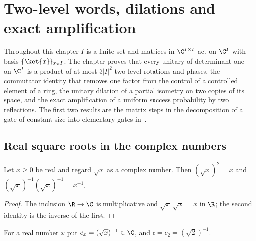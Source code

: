 \chapter{Two-level words, dilations and exact amplification}
\label{ch:unitary_gates}

Throughout this chapter $I$ is a finite set and matrices in $\C^{I\times I}$
act on $\C^I$ with basis $\{\ket{x}\}_{x\in I}$. The chapter proves that every
unitary of determinant one on $\C^I$ is a product of at most $3|I|^2$
two-level rotations and phases, the commutator identity that removes one
factor from the control of a controlled element of a ring, the unitary
dilation of a partial isometry on two copies of its space, and the exact
amplification of a uniform success probability by two reflections. The first
two results are the matrix steps in the decomposition of a gate of constant
size into elementary gates in~\cite[caption of Fig.~1 and paragraph ``The
sequential-RG circuit'']{Malz2024Preparation}.

\section{Real square roots in the complex numbers}
\label{sec:gate_complex_sqrt}

\begin{theorem}
    \label{thm:gate_ofreal_sqrt_sq}
    \leanok
    Let $x\geq0$ be real and regard $\sqrt x$ as a complex number. Then
    $(\sqrt x)^2=x$ and $(\sqrt x)^{-1}(\sqrt x)^{-1}=x^{-1}$.
\end{theorem}
\begin{proof}\leanok
    The inclusion $\R\to\C$ is multiplicative and $\sqrt x\,\sqrt x=x$ in
    $\R$; the second identity is the inverse of the first.
\end{proof}

\begin{definition}
    \label{def:gate_inv_sqrt_two}
    \leanok
    For a real number $x$ put $c_x=(\sqrt x)^{-1}\in\C$, and $c=c_2=(\sqrt2)^{-1}$.
\end{definition}

